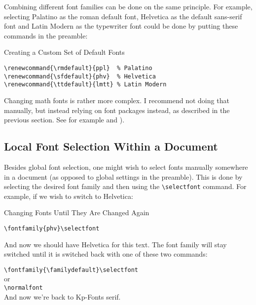 \documentclass[a4paper,oneside,11pt]{article}
\newcommand\comm[1]{\texttt{\textbackslash#1}}
\begin{document}
Combining different  font families  can be  done on  the same  principle.  For
example,  selecting Palatino  as  the  roman default  font,  Helvetica as  the
default sans-serif font and Latin Modern  as the typewriter font could be done
by putting these commands in the preamble:

\begin{titled-frame}
{\textsf{Creating a Custom Set of Default Fonts}}
\vspace{-1em}
\begin{verbatim}
\renewcommand{\rmdefault}{ppl}  % Palatino
\renewcommand{\sfdefault}{phv}  % Helvetica
\renewcommand{\ttdefault}{lmtt} % Latin Modern
\end{verbatim}
\vspace{-1em}
\end{titled-frame}

Changing  math  fonts is  rather  more  complex. I  recommend not  doing  that
manually,  but  instead  relying  on   font  packages  instead,  as  described
in  the  previous  section. See for  example  \cite{stackexch:math-fonts}  and
\cite{practex:fonts}).


\subsection{Local Font Selection Within a Document}
\label{subsec:fontsel:local}

Besides  global  font selection,  one  might  wish  to select  fonts  manually
somewhere in a document (as opposed  to global settings in the preamble). This
is   done  by   selecting  the   desired  font family  and   then  using   the
\comm{selectfont} command. For example, if we wish to switch to Helvetica:

\begin{titled-frame}
{\textsf{Changing Fonts Until They Are Changed Again}}
\vspace{-1em}
\begin{verbatim}
\fontfamily{phv}\selectfont
\end{verbatim}


\selectfont  And  now  we   should  have  Helvetica  for  this
text. The font family will stay switched until it is switched back with one of
these two commands:

\vspace{1em}\noindent
\verb|\fontfamily{\familydefault}\selectfont|\\[1ex]
or\\[1ex]
\noindent
\verb|\normalfont|\\

\noindent\normalfont And now we're back to Kp-Fonts serif.
\end{titled-frame}
\end{document}

